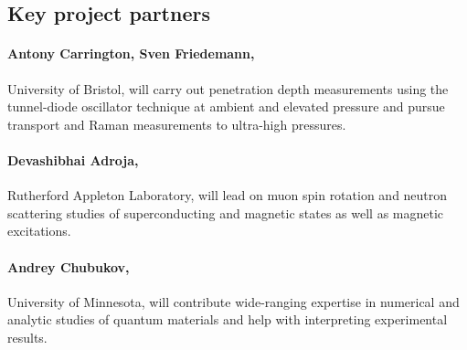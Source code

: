 \subsection*{Key project partners} 

\paragraph{Antony Carrington, Sven Friedemann,} University of Bristol, will carry out penetration depth measurements using the tunnel-diode oscillator technique at ambient and elevated pressure and pursue transport and Raman measurements to ultra-high pressures.%

\paragraph{Devashibhai Adroja,} Rutherford Appleton Laboratory, will lead on muon spin rotation and neutron scattering studies of superconducting and magnetic states as well as magnetic excitations.


\paragraph{Andrey Chubukov,} University of Minnesota, will contribute wide-ranging expertise in numerical
and analytic studies of quantum materials and help with interpreting experimental results. 


